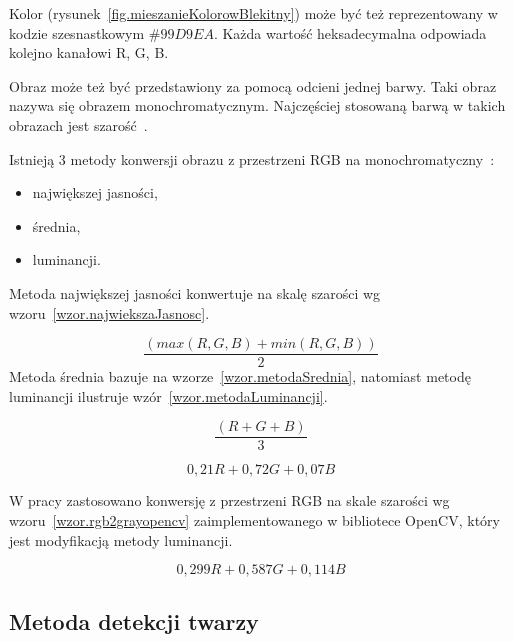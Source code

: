 \documentclass[a4paper,twoside,12pt]{book}
\begin{document}
    Kolor (rysunek~\ref{fig.mieszanieKolorowBlekitny}) może być też reprezentowany w kodzie szesnastkowym $\#99D9EA$.
    Każda
    wartość heksadecymalna odpowiada kolejno kanałowi R, G, B.

    Obraz może też być przedstawiony za pomocą odcieni jednej barwy.
    Taki obraz nazywa się obrazem monochromatycznym.
    Najczęściej stosowaną barwą w takich obrazach jest szarość~\cite{przestrzenieKolorow}.

    Istnieją 3 metody konwersji obrazu z przestrzeni RGB na monochromatyczny~\cite{colorMixing}: %
    \begin{itemize}
        \item największej jasności,
        \item średnia,
        \item luminancji.
    \end{itemize}
    Metoda największej jasności konwertuje na skalę szarości wg wzoru~\ref{wzor.najwiekszaJasnosc}.

    \begin{equation}
        \frac{(max(R, G, B) + min(R, G, B))}{2}
        \label{wzor.najwiekszaJasnosc}
    \end{equation}
    \normalsize
    Metoda średnia bazuje na wzorze~\ref{wzor.metodaSrednia}, natomiast metodę luminancji ilustruje wzór~\ref{wzor.metodaLuminancji}.

    \begin{equation}
        \frac{(R + G + B)}{3}
        \label{wzor.metodaSrednia}
    \end{equation}
    \normalsize

    \begin{equation}
        0,21 R + 0,72 G + 0,07 B
        \label{wzor.metodaLuminancji}
    \end{equation}
    \normalsize

    W pracy zastosowano konwersję z przestrzeni RGB na skale szarości wg wzoru~\ref{wzor.rgb2grayopencv}
    zaimplementowanego w bibliotece OpenCV, który jest modyfikacją metody luminancji.

    \large
    \begin{equation}
        0,299 R + 0,587 G + 0,114 B
        \label{wzor.rgb2grayopencv}
    \end{equation}
    \normalsize

    \subsection{Metoda detekcji twarzy}\label{subsec:algorytm-haar-cascade}
\end{document}

